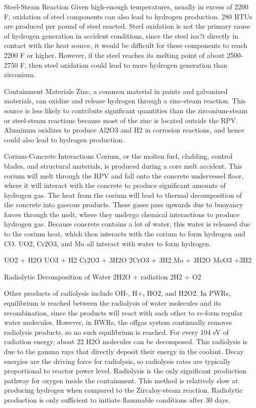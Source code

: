 \documentclass[10pt]{article}
\begin{document}
Steel-Steam Reaction
Given high-enough temperatures, usually in excess of 2200 F, oxidation of steel components can also lead to hydrogen production. 280 BTUs are produced per pound of steel reacted. Steel oxidation is not the primary cause of hydrogen generation in accident conditions, since the steel isn?t directly in contact with the heat source, it would be difficult for these components to reach 2200 F or higher. However, if the steel reaches its melting point of about 2500-2750 F, then steel oxidation could lead to more hydrogen generation than zirconium. 

Containment Materials
Zinc, a common material in paints and galvanized materials, can oxidize and release hydrogen through a zinc-steam reaction. This source is less likely to contribute significant quantities than the zirconium-steam or steel-steam reactions because most of the zinc is located outside the RPV. Aluminum oxidizes to produce Al2O3 and H2 in corrosion reactions, and hence could also lead to hydrogen production. 

Corium-Concrete Interactions
Corium, or the molten fuel, cladding, control blades, and structural materials, is produced during a core melt accident. This corium will melt through the RPV and fall onto the concrete undervessel floor, where it will interact with the concrete to produce significant amounts of hydrogen gas. The heat from the corium will lead to thermal decomposition of the concrete into gaseous products. These gases pass upwards due to buoyancy forces through the melt, where they undergo chemical interactions to produce hydrogen gas. Because concrete contains a lot of water, this water is released due to the corium heat, which then interacts with the corium to form hydrogen and CO. UO2, Cr2O3, and Mo all interact with water to form hydrogen. 

UO2 + H2O  UO3 + H2
Cr2O3 + 3H2O  2CrO3 + 3H2
Mo + 3H2O  MoO3 +3H2

Radiolytic Decomposition of Water
2H2O + radiation  2H2 + O2

Other products of radiolysis include OH-, H+, HO2, and H2O2. In PWRs, equilibrium is reached between the radiolysis of water molecules and its recombination, since the products will react with each other to re-form regular water molecules. However, in BWRs, the offgas system continually removes radiolysis products, so no such equilibrium is reached. For every 104 eV of radiation energy, about 22 H2O molecules can be decomposed. This radiolysis is due to the gamma rays that directly deposit their energy in the coolant. Decay energies are the driving force for radiolysis, so radiolysis rates are typically proportional to reactor power level. Radiolysis is the only significant production pathway for oxygen inside the containment. This method is relatively slow at producing hydrogen when compared to the Zircaloy-steam reaction. Radiolytic production is only sufficient to initiate flammable conditions after 30 days. 
\end{document}
